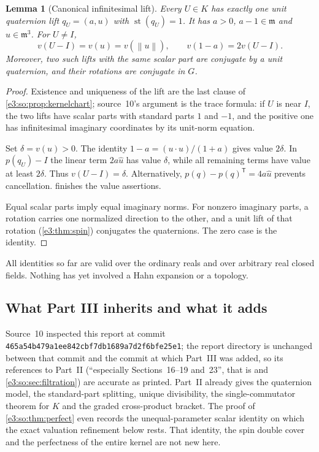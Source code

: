 \documentclass[11pt,letterpaper]{article}
\numberwithin{equation}{section}
\newtheorem{lemma}[lemma]{Lemma}
\theoremstyle{definition}
\theoremstyle{remark}
\newcommand{\mm}{\mathfrak m}
\newcommand{\st}{\operatorname{st}}
\newcommand{\norm}[1]{\left\lVert#1\right\rVert}
\newcommand{\transpose}{^{\mathsf T}}
\begin{document}
\begin{lemma}[Canonical infinitesimal lift]\label{e3:cut:lem:lift}
Every $U\in K$ has exactly one unit quaternion lift $q_U=(a,u)$ with
$\st(q_U)=1$. It has $a>0$, $a-1\in\mm$ and $u\in\mm^3$. For $U\ne I$,
\begin{equation}\label{e3:cut:eq:liftdepth}
 v(U-I)=v(u)=v(\norm u),\qquad v(1-a)=2v(U-I).
\end{equation}
Moreover, two such lifts with the same scalar part are conjugate by a unit
quaternion, and their rotations are conjugate in $G$.
\end{lemma}
\begin{proof}
Existence and uniqueness of the lift are the last clause of
\cref{e3:so:prop:kernelchart}; source~10's argument is the trace formula: if
$U$ is near $I$, the two lifts have scalar parts with standard parts $1$ and
$-1$, and the positive one has infinitesimal imaginary coordinates by its
unit-norm equation.

Set $\delta=v(u)>0$. The identity $1-a=(u\cdot u)/(1+a)$ gives value
$2\delta$. In $p(q_U)-I$ the linear term $2a\widehat u$ has value $\delta$,
while all remaining terms have value at least $2\delta$. Thus
$v(U-I)=\delta$. Alternatively, $p(q)-p(q)\transpose=4a\widehat u$ prevents
cancellation.  finishes the value assertions.

Equal scalar parts imply equal imaginary norms. For nonzero imaginary parts, a
rotation carries one normalized direction to the other, and a unit lift of
that rotation (\cref{e3:thm:spin}) conjugates the quaternions. The zero case
is the identity.
\end{proof}

All identities so far are valid over the ordinary reals and over arbitrary real
closed fields. Nothing has yet involved a Hahn expansion or a topology.

\subsection{What Part III inherits and what it adds}\label{e3:cut:sub:inherited}

Source~10 inspected this report at commit
\texttt{465a54b479a1ee842cbf7db1689a7d2f6bfe25e1}; the report directory is
unchanged between that commit and the commit at which Part~III was added, so
its references to Part~II (``especially Sections~16--19 and~23'', that is
 and \cref{e3:so:sec:filtration})
are accurate as printed. Part~II already gives the quaternion
model, the standard-part splitting, unique divisibility, the single-commutator
theorem for $K$ and the graded cross-product bracket. The proof of
\cref{e3:so:thm:perfect} even records the unequal-parameter scalar identity on
which the exact valuation refinement below rests. That identity, the spin double
cover and the perfectness of the entire kernel are not new here.
\end{document}

